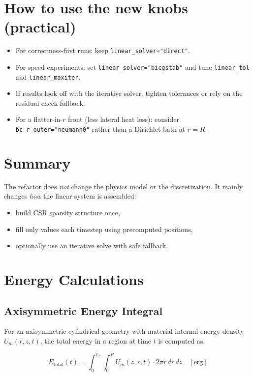 \documentclass[11pt]{article}
\begin{document}
\section*{How to use the new knobs (practical)}
\begin{itemize}
  \item For correctness-first runs: keep \texttt{linear\_solver="direct"}.
  \item For speed experiments: set \texttt{linear\_solver="bicgstab"} and tune \texttt{linear\_tol} and \texttt{linear\_maxiter}.
  \item If results look off with the iterative solver, tighten tolerances or rely on the residual-check fallback.
  \item For a flatter-in-$r$ front (less lateral heat loss): consider \texttt{bc\_r\_outer="neumann0"} rather than a Dirichlet bath at $r=R$.
\end{itemize}

\section*{Summary}
The refactor does \emph{not} change the physics model or the discretization. It mainly changes \emph{how} the linear system is assembled:
\begin{itemize}
  \item build CSR sparsity structure once,
  \item fill only values each timestep using precomputed positions,
  \item optionally use an iterative solve with safe fallback.
\end{itemize}


\section{Energy Calculations}

\subsection{Axisymmetric Energy Integral}

For an axisymmetric cylindrical geometry with material internal energy density $U_m(r,z,t)$, the total energy in a region at time $t$ is computed as:

\begin{equation}
E_{\text{total}}(t) = \int_0^{L_z} \int_0^{R} U_m(z,r,t) \cdot 2\pi r \, dr \, dz \quad [\text{erg}]
\end{equation}
\end{document}
